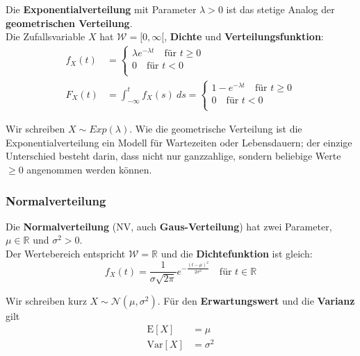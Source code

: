 \documentclass[11pt]{article}
\newcommand{\E}{\text{E}}
\newcommand{\Var}{\text{Var}}
\begin{document}
Die \textbf{Exponentialverteilung} mit Parameter $\lambda > 0$ ist das stetige Analog der \textbf{geometrischen Verteilung}. \\
Die Zufallsvariable $X$ hat $\mathcal{W} = [0, \infty[$, \textbf{Dichte} und \textbf{Verteilungsfunktion}:
\begin{equation*}
\begin{split}
	f_X(t) & = \begin{cases}
		\lambda e^{-\lambda t}\quad\text{f{\"u}r } t \geq 0 \\
		0 \quad\text{f{\"u}r } t < 0 \\
	\end{cases} \\
	F_X(t) & = \int_{-\infty}^t f_X(s)\ ds = \begin{cases}
		1 - e^{-\lambda t} \quad\text{f{\"u}r } t \geq 0 \\
		0 \quad\text{f{\"u}r } t < 0 \\
	\end{cases}
\end{split}
\end{equation*}

Wir schreiben $X \sim Exp(\lambda)$. Wie die geometrische Verteilung ist die Exponentialverteilung ein Modell f{\"u}r Wartezeiten oder Lebensdauern; der einzige Unterschied besteht darin, dass nicht nur ganzzahlige, sondern beliebige Werte $\geq 0$ angenommen werden k{\"o}nnen.

\subsubsection{Normalverteilung}

Die \textbf{Normalverteilung} (NV, auch \textbf{Gaus-Verteilung}) hat zwei Parameter, $\mu \in \mathbb{R}$ und $\sigma^2 > 0$. \\
Der Wertebereich entspricht $\mathcal{W} = \mathbb{R}$ und die \textbf{Dichtefunktion} ist gleich:
\begin{equation*}
	f_X(t) = \frac{1}{\sigma\sqrt{2\pi}}e^{-\frac{(t-\mu)^2}{2\sigma^2}}\quad\text{f{\"u}r } t \in \mathbb{R}
\end{equation*}

Wir schreiben kurz $X \sim \mathcal{N}(\mu, \sigma^2)$. F{\"u}r den \textbf{Erwartungswert} und die \textbf{Varianz} gilt
\begin{equation*}
\begin{split}
	\E[X] & = \mu \\
	\Var[X] & = \sigma^2 \\
\end{split}
\end{equation*}
\end{document}
